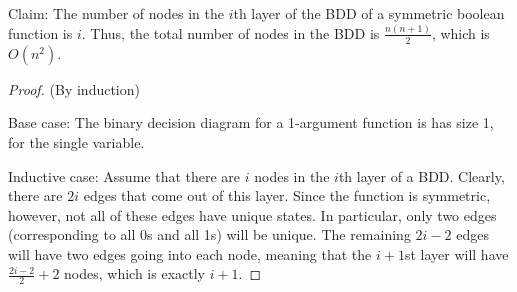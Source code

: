 \documentclass{amsart}
\begin{document}
\begin{enumerate}
    Claim: The number of nodes in the $i$th layer of the BDD of a symmetric
    boolean function is $i$.  Thus, the total number of nodes in the BDD is
    $\frac{n (n+1)}{2}$, which is $O(n^2)$.
\begin{proof}
  (By induction)

  Base case: The binary decision diagram for a 1-argument function is has size
  1, for the single variable.

  Inductive case:  Assume that there are $i$ nodes in the $i$th layer of a BDD.
  Clearly, there are $2i$ edges that come out of this layer.
  Since the function is symmetric, however, not all of these edges have unique
  states.  In particular, only two edges (corresponding to all 0s and all 1s)
  will be unique.  The remaining $2i - 2$ edges will have two edges going into
  each node, meaning that the $i+1$st layer will have $\frac{2i -2}{2} + 2$
  nodes, which is exactly $i+1$.
\end{proof}
\end{enumerate}
\end{document}

